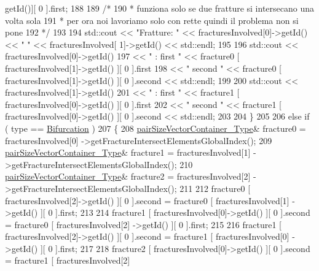 \begin{DoxyCode}
      getId()][ 0 ].first;
188                 
189                 \textcolor{comment}{/*}
190 \textcolor{comment}{                 * funziona solo se due fratture si intersecano una volta sola}
191 \textcolor{comment}{                 * per ora noi lavoriamo solo con rette quindi il problema non si pone}
192 \textcolor{comment}{                 */}
193     
194                 std::cout << \textcolor{stringliteral}{"Fratture: "} << fracturesInvolved[0]->getId() << \textcolor{stringliteral}{"     "} << fracturesInvolved[
      1]->getId() << std::endl;
195     
196                 std::cout << fracturesInvolved[0]->getId()
197                                 << \textcolor{stringliteral}{" :   first "} << fracture0 [ fracturesInvolved[1]->getId() ][ 0 ].first
198                                 << \textcolor{stringliteral}{" second "} << fracture0 [ fracturesInvolved[1]->getId() ][ 0 ].second <<
       std::endl;
199     
200                 std::cout << fracturesInvolved[1]->getId()
201                                 << \textcolor{stringliteral}{" :   first "} << fracture1 [ fracturesInvolved[0]->getId() ][ 0 ].first
202                                 << \textcolor{stringliteral}{" second "} << fracture1 [ fracturesInvolved[0]->getId() ][ 0 ].second <<
       std::endl;
203     
204             \}
205 
206             \textcolor{keywordflow}{else} \textcolor{keywordflow}{if} ( type == \hyperlink{classFractureIntersect_a9a4e4a784fa4c8e359767ed543f89dc5a4d466b3d3de0af7e18732b6f765bb1af}{Bifurcation} )
207             \{    
208                 \hyperlink{Core_8h_a9bc476e433f99b82a9c2b8560735c7b5}{pairSizeVectorContainer\_Type}& fracture0 = fracturesInvolved[0]
      ->getFractureIntersectElementsGlobalIndex();
209                 \hyperlink{Core_8h_a9bc476e433f99b82a9c2b8560735c7b5}{pairSizeVectorContainer\_Type}& fracture1 = fracturesInvolved[1]
      ->getFractureIntersectElementsGlobalIndex();
210                 \hyperlink{Core_8h_a9bc476e433f99b82a9c2b8560735c7b5}{pairSizeVectorContainer\_Type}& fracture2 = fracturesInvolved[2]
      ->getFractureIntersectElementsGlobalIndex();
211                 
212                 fracture0 [ fracturesInvolved[2]->getId() ][ 0 ].second = fracture0 [ fracturesInvolved[1]
      ->getId() ][ 0 ].first;
213      
214                 fracture1 [ fracturesInvolved[0]->getId() ][ 0 ].second = fracture0 [ fracturesInvolved[2]
      ->getId() ][ 0 ].first;
215      
216                 fracture1 [ fracturesInvolved[2]->getId() ][ 0 ].second = fracture1 [ fracturesInvolved[0]
      ->getId() ][ 0 ].first;
217      
218                 fracture2 [ fracturesInvolved[0]->getId() ][ 0 ].second = fracture1 [ fracturesInvolved[2]

\end{DoxyCode}
